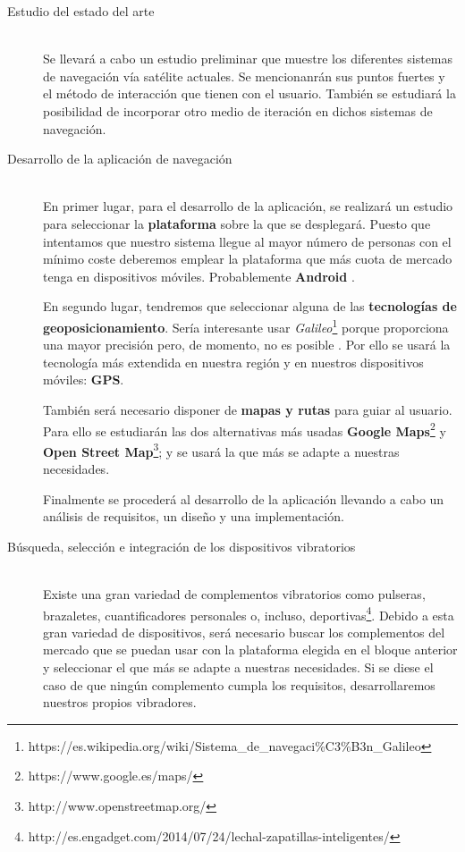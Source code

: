 \documentclass{pre-tfg}
\begin{document}
\begin{description}
  \item[Estudio del estado del arte] \hfill \\
  Se llevará a cabo un estudio preliminar que muestre los diferentes sistemas de navegación vía satélite actuales. Se mencionanrán sus puntos fuertes y el método de interacción que tienen con el usuario. También se estudiará la posibilidad de incorporar otro medio de iteración en dichos sistemas de navegación.
  
  \item[Desarrollo de la aplicación de navegación] \hfill \\
  En primer lugar, para el desarrollo de la aplicación, se realizará un estudio para seleccionar la \textbf{plataforma} sobre la que se desplegará. Puesto que intentamos que nuestro sistema llegue al mayor número de personas con el mínimo coste deberemos emplear la plataforma que más cuota de mercado tenga en dispositivos móviles. Probablemente \textbf{Android} \cite{Mercado}. 
  
  En segundo lugar, tendremos que seleccionar alguna de las \textbf{tecnologías de geoposicionamiento}. Sería interesante usar \textit{Galileo}\footnote{https://es.wikipedia.org/wiki/Sistema\_de\_navegaci\%C3\%B3n\_Galileo} porque proporciona una mayor precisión pero, de momento, no es posible \cite{SPSA} . Por ello se usará la tecnología más extendida en nuestra región y en nuestros dispositivos móviles: \textbf{GPS}.
  
  También será necesario disponer de \textbf{mapas y rutas} para guiar al usuario. Para ello se estudiarán las dos alternativas más usadas \textbf{Google Maps}\footnote{https://www.google.es/maps/} y \textbf{Open Street Map}\footnote{http://www.openstreetmap.org/}; y se usará la que más se adapte a nuestras necesidades.
  
  Finalmente se procederá al desarrollo de la aplicación llevando a cabo un análisis de requisitos, un diseño y una implementación.
  
  \item[Búsqueda, selección e integración de los dispositivos vibratorios] \hfill \\
  Existe una gran variedad de complementos vibratorios como pulseras, brazaletes, cuantificadores personales o, incluso, deportivas\footnote{http://es.engadget.com/2014/07/24/lechal-zapatillas-inteligentes/}. Debido a esta gran variedad de dispositivos, será necesario buscar los complementos del mercado que se puedan usar con la plataforma elegida en el bloque anterior y seleccionar el que más se adapte a nuestras necesidades. Si se diese el caso de que ningún complemento cumpla los requisitos, desarrollaremos nuestros propios vibradores.


\end{description}
\end{document}
